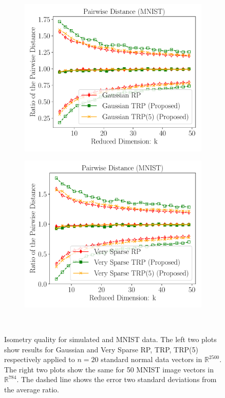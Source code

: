 \begin{figure}[H]
\begin{subfigure}{0.24\textwidth}
	\end{subfigure}
	\begin{subfigure}{0.24\textwidth}
		\includegraphics[scale = 0.22]{figure/dist_g_mnist.pdf}
	\end{subfigure}
	\begin{subfigure}{0.24\textwidth}
		\includegraphics[scale = 0.22]{figure/dist_sp1_mnist.pdf}
	\end{subfigure}\\
	\caption{Isometry quality for simulated and MNIST data.
		The left two plots show results for Gaussian and Very Sparse RP, TRP, TRP(5)
		respectively applied to $n = 20$ standard normal data vectors in $\mathbb{R}^{2500}$.
		The right two plots show the same for 50 MNIST image vectors in $\mathbb{R}^{784}$.
		The dashed line shows the error two standard deviations from the average ratio.}
	\label{fig:main}
\end{figure}

